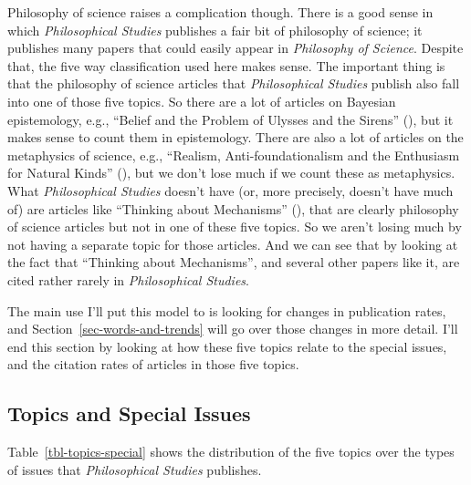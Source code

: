 \documentclass[
  11pt,
  letterpaper,
  DIV=11,
  numbers=noendperiod,
  twoside]{scrartcl}
\begin{document}
Philosophy of science raises a complication though. There is a good
sense in which \emph{Philosophical Studies} publishes a fair bit of
philosophy of science; it publishes many papers that could easily appear
in \emph{Philosophy of Science}. Despite that, the five way
classification used here makes sense. The important thing is that the
philosophy of science articles that \emph{Philosophical Studies} publish
also fall into one of those five topics. So there are a lot of articles
on Bayesian epistemology, e.g., ``Belief and the Problem of Ulysses and
the Sirens'' (), but
it makes sense to count them in epistemology. There are also a lot of
articles on the metaphysics of science, e.g., ``Realism,
Anti-foundationalism and the Enthusiasm for Natural Kinds''
(), but we don't lose much
if we count these as metaphysics. What \emph{Philosophical Studies}
doesn't have (or, more precisely, doesn't have much of) are articles
like ``Thinking about Mechanisms''
(),
that are clearly philosophy of science articles but not in one of these
five topics. So we aren't losing much by not having a separate topic for
those articles. And we can see that by looking at the fact that
``Thinking about Mechanisms'', and several other papers like it, are
cited rather rarely in \emph{Philosophical Studies}.

The main use I'll put this model to is looking for changes in
publication rates, and Section~\ref{sec-words-and-trends} will go over
those changes in more detail. I'll end this section by looking at how
these five topics relate to the special issues, and the citation rates
of articles in those five topics.

\subsection{Topics and Special Issues}\label{topics-and-special-issues}

Table~\ref{tbl-topics-special} shows the distribution of the five topics
over the types of issues that \emph{Philosophical Studies} publishes.
\end{document}
